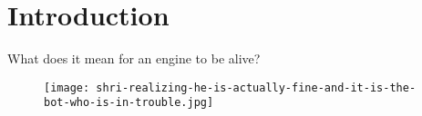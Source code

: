 \documentclass{article}
\begin{document}
    \section{Introduction}
    What does it mean for an engine to be alive?
    \begin{figure}[!ht]
        \begin{center}
            \texttt{[image: shri-realizing-he-is-actually-fine-and-it-is-the-bot-who-is-in-trouble.jpg]}
        \end{center}
    \end{figure}
\end{document}
